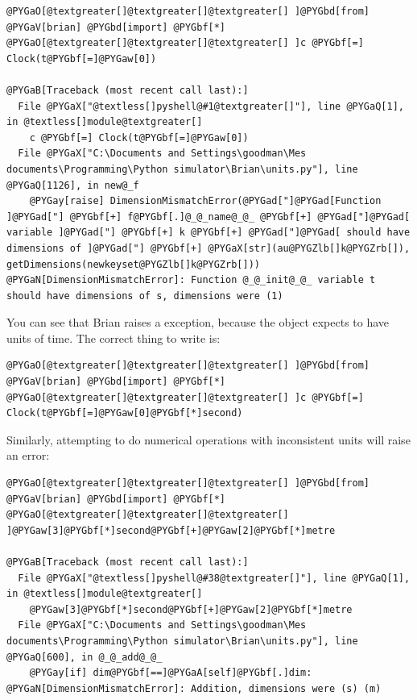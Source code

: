 \documentclass[letterpaper,10pt,english]{manual}
\begin{document}
\begin{Verbatim}[commandchars=@\[\]]
@PYGaO[@textgreater[]@textgreater[]@textgreater[] ]@PYGbd[from] @PYGaV[brian] @PYGbd[import] @PYGbf[*]
@PYGaO[@textgreater[]@textgreater[]@textgreater[] ]c @PYGbf[=] Clock(t@PYGbf[=]@PYGaw[0])

@PYGaB[Traceback (most recent call last):]
  File @PYGaX["@textless[]pyshell@#1@textgreater[]"], line @PYGaQ[1], in @textless[]module@textgreater[]
    c @PYGbf[=] Clock(t@PYGbf[=]@PYGaw[0])
  File @PYGaX["C:\Documents and Settings\goodman\Mes documents\Programming\Python simulator\Brian\units.py"], line @PYGaQ[1126], in new@_f
    @PYGay[raise] DimensionMismatchError(@PYGad["]@PYGad[Function ]@PYGad["] @PYGbf[+] f@PYGbf[.]@_@_name@_@_ @PYGbf[+] @PYGad["]@PYGad[ variable ]@PYGad["] @PYGbf[+] k @PYGbf[+] @PYGad["]@PYGad[ should have dimensions of ]@PYGad["] @PYGbf[+] @PYGaX[str](au@PYGZlb[]k@PYGZrb[]), getDimensions(newkeyset@PYGZlb[]k@PYGZrb[]))
@PYGaN[DimensionMismatchError]: Function @_@_init@_@_ variable t should have dimensions of s, dimensions were (1)
\end{Verbatim}

You can see that Brian raises a  exception, because the
\hyperlink{brian.Clock}{} object expects  to have units of time. The correct thing to write is:

\begin{Verbatim}[commandchars=@\[\]]
@PYGaO[@textgreater[]@textgreater[]@textgreater[] ]@PYGbd[from] @PYGaV[brian] @PYGbd[import] @PYGbf[*]
@PYGaO[@textgreater[]@textgreater[]@textgreater[] ]c @PYGbf[=] Clock(t@PYGbf[=]@PYGaw[0]@PYGbf[*]second)
\end{Verbatim}

Similarly, attempting to do numerical operations with inconsistent units will
raise an error:

\begin{Verbatim}[commandchars=@\[\]]
@PYGaO[@textgreater[]@textgreater[]@textgreater[] ]@PYGbd[from] @PYGaV[brian] @PYGbd[import] @PYGbf[*]
@PYGaO[@textgreater[]@textgreater[]@textgreater[] ]@PYGaw[3]@PYGbf[*]second@PYGbf[+]@PYGaw[2]@PYGbf[*]metre

@PYGaB[Traceback (most recent call last):]
  File @PYGaX["@textless[]pyshell@#38@textgreater[]"], line @PYGaQ[1], in @textless[]module@textgreater[]
    @PYGaw[3]@PYGbf[*]second@PYGbf[+]@PYGaw[2]@PYGbf[*]metre
  File @PYGaX["C:\Documents and Settings\goodman\Mes documents\Programming\Python simulator\Brian\units.py"], line @PYGaQ[600], in @_@_add@_@_
    @PYGay[if] dim@PYGbf[==]@PYGaA[self]@PYGbf[.]dim:
@PYGaN[DimensionMismatchError]: Addition, dimensions were (s) (m)
\end{Verbatim}
\end{document}
